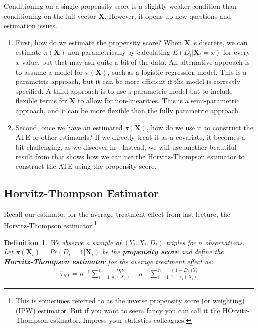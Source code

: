 \documentclass{tufte-handout}
\theoremstyle{break}
\newtheorem{defN}{Definition}
\newcommand{\bX}{\mathbf{X}}
\begin{document}
Conditioning on a single propensity score is a slightly weaker condition than conditioning on the full vector $\bX$. However, it opens up new questions and estimation issues. 

\begin{enumerate}
    \item  First, how do we estimate the propensity score? When $\bX$ is discrete, we can estimate $\pi(\bX)$ non-parametrically by calculating $E(D_{i} | \bX_{i} = x)$ for every $x$ value, but that may ask quite a bit of the data. An alternative approach is to assume a model for $\pi(\bX)$, such as a logistic regression model. This is a parametric approach, but it can be more efficient if the model is correctly specified. A third approach is to use a parametric model but to include flexible terms for $\bX$ to allow for non-linearities. This is a semi-parametric approach, and it can be more flexible than the fully parametric approach.
    \item Second, once we have an estimated $\pi(\bX)$, how do we use it to construct the ATE or other estimands? If we directly treat it as a covariate, it becomes a bit challenging, as we discover in . Instead, we will use another beautiful result from \citet{rosenbaum1983central} that shows how we can use the Horvitz-Thompson estimator to construct the ATE using the propensity score.
\end{enumerate}

\subsection{Horvitz-Thompson Estimator}
Recall our estimator for the average treatment effect from last lecture, the \underline{Horvitz-Thompson estimator}:\footnote{This is sometimes referred to as the inverse propensity score (or weighting) (IPW) estimator. But if you want to seem fancy you can call it the HOrvitz-Thompson estimator. Impress your statistics colleagues!}
\begin{defN}
    We observe a sample of $(Y_{i}, X_{i}, D_{i})$ triples for $n$ observations. Let $\pi(\bX_{i}) = Pr(D_{i} = 1 | \bX_{i})$ be the \textbf{propensity score} and define the \textbf{Horvitz-Thompson estimator} for the average treatment effect as:
    \begin{align*}
        \hat{\tau}_{HT} = n^{-1} \sum_{i=1}^n \frac{D_i Y_i}{\pi_i(X_{i})} - n^{-1} \sum_{i=1}^n \frac{(1-D_i) Y_i}{1-\pi_i(X_{i})}
    \end{align*}
\end{defN}
\end{document}
